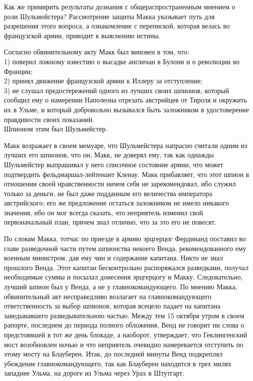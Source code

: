 \documentclass[
  oneside,
  12pt,
  titlepage]{book}
\begin{document}
Как же примирить результаты дознания с общераспространенным мнением о роли Шульмейстера? Рассмотрение защиты Макка указывает путь для разрешения этого вопроса, а ознакомление с перепиской, которая велась во французской армии, приводит к выяснению истины.

Согласно обвинительному акту Макк был виновен в том, что:\\
1) поверил ложному известию о высадке англичан в Булони и о революции во Франции;\\
2) принял движение французской армии к Иллеру за отступление;\\
3) не слушал предостережений одного из лучших своих шпионов, который сообщил ему о намерении Наполеона отрезать австрийцев от Тироля и окружить их в Ульме, и который добровольно вызывался быть заложником в удостоверение правдивости своих показаний.\\
Шпионом этим был Шульмейстер.

Макк возражает в своем мемуаре, что Шульмейстера напрасно считали одним из лучших его шпионов, что он, Макк, не доверял ему, так как однажды Шульмейстер выпрашивал у него списочное состояние армии, что может подтвердить фельдмаршал-лейтенант Кленау. Макк прибавляет, что этот шпион в отношении своей нравственности ничем себя не зарекомендовал, ибо служил только за деньги, не был даже подданным его величества императора австрийского; его же предложение остаться заложником не имело никакого значения, ибо он мог всегда сказать, что неприятель изменил свой первоначальный план, причем знал отлично, что за это его не повесят.

По словам Макка, тотчас по приезде в армию эрцгерцог Фердинанд поставил во главе разведочной части путем шпионства некоего Венда, рекомендованного ему военным министром, дав ему чин и содержание капитана. Никто не знал прошлого Венда. Этот капитан бесконтрольно распоряжался разведками, получал необходимые суммы и посылал донесения эрцгерцогу и Макку. Следовательно, лучший шпион был у Венда, а не у главнокомандующего. По мнению Макка, обвинительный акт несправедливо возлагает на главнокомандующего ответственность за выбор шпионов, которая всецело падает на капитана заведывавшего разведывательною частью. Между тем 15 октября утром в своем рапорте, последнем до периода полного обложения, Венд не говорит ни слова о предстоявшей в тот же день блокаде, а наоборот, утверждает, что Геклингенский мост возобновлен ночью и что неприятель очевидно намеревается отступить по этому мосту на Блауберен. Итак, до последней минуты Венд подкреплял убеждение главнокомандующего, так как Блауберен находится в трех милях западнее Ульма, на дороге из Ульма через Урах в Штутгарт.
\end{document}
